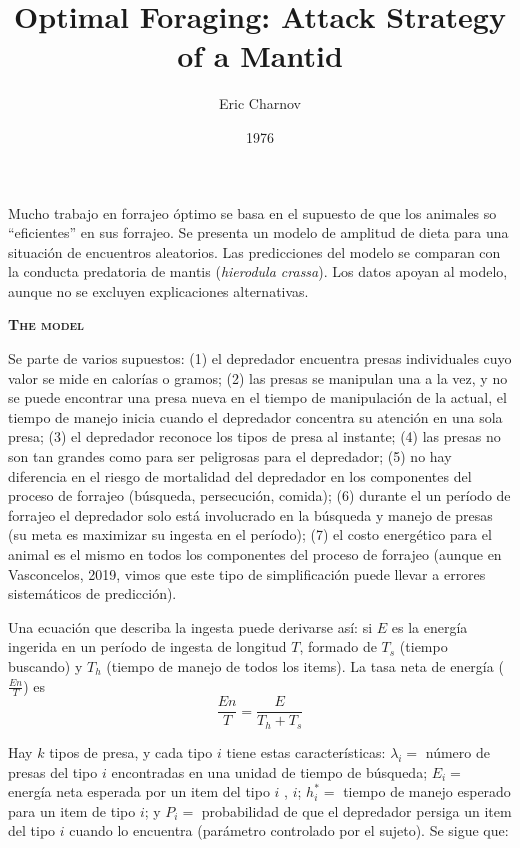 \documentclass[a4paper,12pt]{article}
\title{Optimal Foraging: Attack Strategy of a Mantid}
\author{Eric Charnov}
\date{1976}
\begin{document}
{\scshape\bfseries \maketitle}

Mucho trabajo en forrajeo óptimo se basa en el supuesto de que los animales so ``eficientes'' en sus forrajeo. Se presenta un modelo de amplitud de dieta para una situación de encuentros aleatorios. Las predicciones del modelo se comparan con la conducta predatoria de mantis ({\itshape hierodula crassa}). Los datos apoyan al modelo, aunque no se excluyen explicaciones alternativas.

{\scshape\bfseries The model}

Se parte de varios supuestos: (1) el depredador encuentra presas individuales cuyo valor se mide en calorías o gramos; (2) las presas se manipulan una a la vez, y no se puede encontrar una presa nueva en el tiempo de manipulación de la actual, el tiempo de manejo inicia cuando el depredador concentra su atención en una sola presa; (3) el depredador reconoce los tipos de presa al instante; (4) las presas no son tan grandes como para ser peligrosas para el depredador; (5) no hay diferencia en el riesgo de mortalidad del depredador en los componentes del proceso de forrajeo (búsqueda, persecución, comida); (6) durante el un período de forrajeo el depredador solo está involucrado en la búsqueda y manejo de presas (su meta es maximizar su ingesta en el período); (7) el costo energético para el animal es el mismo en todos los componentes del proceso de forrajeo (aunque en Vasconcelos, 2019, vimos que este tipo de simplificación puede llevar a errores sistemáticos de predicción).

Una ecuación que describa la ingesta puede derivarse así: si $E$ es la energía ingerida en un período de ingesta de longitud $T$, formado de $T_{s}$ (tiempo buscando) y $T_{h}$ (tiempo de manejo de todos los items). La tasa neta de energía ($\frac{En}{T}$) es
\[
\frac{
        En
}{
        T
}
=
\frac{
        E
}{
        T_{h} + T_{s}
}
\]

Hay $k$ tipos de presa, y cada tipo $i$ tiene estas características: $\lambda_{i} =$ número de presas del tipo $i$ encontradas en una unidad de tiempo de búsqueda; $E_{i} =$ energía neta esperada por un item del tipo $i$ , $i$; $h_{i}^{*} =$ tiempo de manejo esperado para un item de tipo $i$; y $P_{i} =$ probabilidad de que el depredador persiga un item del tipo $i$ cuando lo encuentra (parámetro controlado por el sujeto). Se sigue que:
\end{document}
